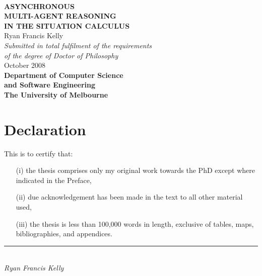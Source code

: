 %
%







\begin{titlepage}
\begin{center}
\ \\
\vspace{2cm}
{\bf\LARGE  ASYNCHRONOUS }\\ \vspace{0.5cm}
{\bf\LARGE  MULTI-AGENT REASONING }\\ \vspace{0.5cm}
{\bf\LARGE  IN THE SITUATION CALCULUS } \\
\vspace{3cm}
{\LARGE      Ryan Francis Kelly       }\\
\vspace{5cm}
{\em\large Submitted in total fulfilment of the requirements}\\ \vspace{0.1cm}
{\em\large        of the degree of Doctor of Philosophy     }\\
\vspace{0.5cm}
{\Large             October 2008        }\\
\vspace{2.5cm}
{\bf\large Department of Computer Science\\ and Software Engineering}\\ \vspace{0.5cm}
{\bf\Large        The University of Melbourne     }\\
\vspace{0.5cm}
\end{center}
\end{titlepage}

\cleardoublepage
{}



\chapter*{Declaration}
This is to certify that:
\begin{itemize}
\item[(i)] the thesis comprises only my original work towards the PhD except where indicated in the Preface,
\item[(ii)] due acknowledgement has been made in the text to all other material used,
\item[(iii)] the thesis is less than 100,000 words in length, exclusive of tables, maps, bibliographies, and appendices.
\end{itemize}
\vspace{3cm}
\rule{70mm}{0.1mm}\\
\emph{Ryan Francis Kelly}

